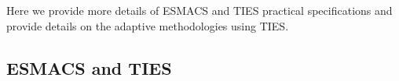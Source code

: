 


Here we provide more details of ESMACS and TIES practical specifications and 
provide details on the adaptive methodologies using TIES. 



\subsection{ESMACS and TIES}\label{ssec:esm_ties}








